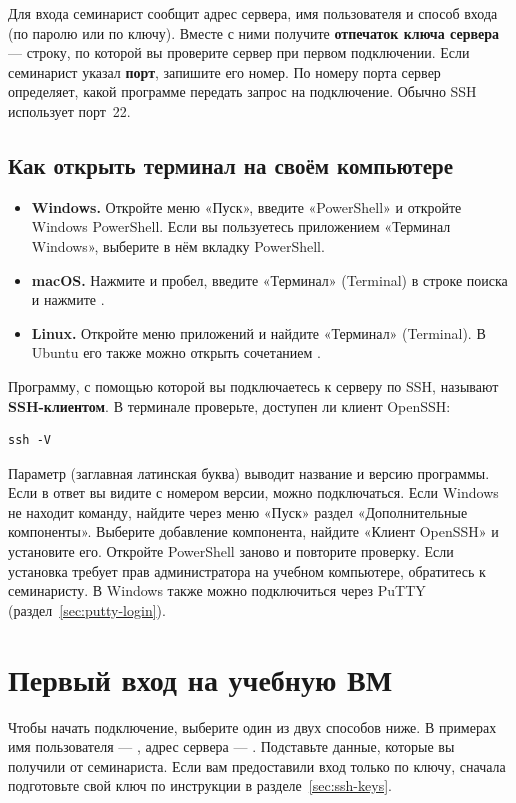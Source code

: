 Для входа семинарист сообщит адрес сервера, имя пользователя и способ
входа (по паролю или по ключу). Вместе с ними получите
\textbf{отпечаток ключа сервера} --- строку, по которой вы проверите
сервер при первом подключении. Если семинарист указал \textbf{порт},
запишите его номер. По номеру порта сервер определяет, какой программе
передать запрос на подключение. Обычно SSH использует порт~22.

\subsection{Как открыть терминал на своём компьютере}

\begin{itemize}
  \item \textbf{Windows.} Откройте меню «Пуск», введите «PowerShell»
    и откройте Windows PowerShell. Если вы пользуетесь приложением
    «Терминал Windows», выберите в нём вкладку PowerShell.
  \item \textbf{macOS.} Нажмите  и пробел, введите
    «Терминал» (Terminal) в строке поиска и нажмите .
  \item \textbf{Linux.} Откройте меню приложений и найдите «Терминал»
    (Terminal). В Ubuntu его также можно открыть сочетанием .
\end{itemize}

Программу, с помощью которой вы подключаетесь к серверу по SSH, называют
\textbf{SSH-клиентом}. В терминале проверьте, доступен ли клиент OpenSSH:
\begin{verbatim}
ssh -V
\end{verbatim}
Параметр  (заглавная латинская буква) выводит название и версию
программы. Если в ответ вы видите  с номером версии, можно
подключаться. Если Windows не находит команду, найдите через меню «Пуск»
раздел «Дополнительные компоненты». Выберите добавление компонента,
найдите «Клиент OpenSSH» и установите его. Откройте PowerShell заново
и повторите проверку. Если установка требует прав администратора на
учебном компьютере, обратитесь к семинаристу.
В Windows также можно подключиться через PuTTY (раздел~\ref{sec:putty-login}).

\section{Первый вход на учебную ВМ}
\label{sec:first-ssh-login}

Чтобы начать подключение, выберите один из двух способов ниже.
В примерах имя пользователя --- , адрес сервера ---
. Подставьте данные, которые вы получили от
семинариста. Если вам предоставили вход только по ключу, сначала
подготовьте свой ключ по инструкции в разделе~\ref{sec:ssh-keys}.

